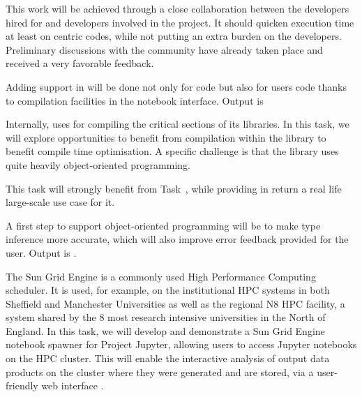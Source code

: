 \begin{workpackage}
\begin{tasklist}
\begin{task}[title=Pythran,id=pythran,lead=LL,partners={UJF},PM=24, wphases=0-48]
  This work will be achieved through a close collaboration between the \Pythran
  developers hired for \TheProject and \Cython developers involved in the \Sage
  project. It should quicken \Sage execution time at least on \Numpy centric
  codes, while not putting an extra burden on the developers.  Preliminary
  discussions with the \Cython community have already taken place and received a
  very favorable feedback.

  Adding \Pythran support in \Sage will be done not only for \Sage code but also
  for \Sage users code thanks to compilation facilities in the notebook interface.
  Output is 


  Internally, \Sage uses \Cython for compiling the critical sections of
  its libraries. In this task, we will explore opportunities to
  benefit from \Pythran compilation within the \Sage library to benefit
  \Pythran compile time optimisation. A specific challenge is that the \Sage
  library uses quite heavily object-oriented programming.

  This task will strongly benefit from Task~,
  while providing in return a real life large-scale use case for it.

  A first step to support object-oriented programming will be to make
  \Pythran type inference more accurate, which will also improve error
  feedback provided for the user. Output is .
\end{task}

\begin{task}[title=Sun Grid Engine Integration in Project Jupyter Hub, lead=USH,id=hpc-jupyter,PM=12]
The Sun Grid Engine is a commonly used High Performance Computing scheduler. It is used, for example, on the institutional HPC systems in both Sheffield and Manchester Universities as well as the regional N8 HPC facility, a system shared by the 8 most research intensive universities in the North of England. In this task, we will develop and demonstrate a Sun Grid Engine notebook spawner for Project Jupyter, allowing users to access Jupyter notebooks on the HPC cluster. This will enable the interactive analysis of output data products on the cluster where they were generated and are stored, via a user-friendly web interface .
\end{task}
\end{tasklist}


\end{workpackage}
